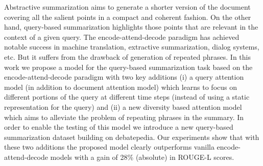 Abstractive summarization aims to generate a shorter version of the document covering all the salient points in a compact and coherent fashion. On the other hand, query-based summarization highlights those points that are relevant in the context of a given query. The encode-attend-decode paradigm has achieved notable success in machine translation, extractive summarization, dialog systems, etc. But it suffers from the drawback of generation of repeated phrases. In this work we propose a model for the query-based summarization task based on the encode-attend-decode paradigm with two key additions (i) a query attention model (in addition to document attention model) which learns to focus on different portions of the query at different time steps (instead of using a static representation for the query) and (ii) a new diversity based attention model which aims to alleviate the problem of repeating phrases in the summary. In order to enable the testing of this model we introduce a new query-based summarization dataset building on debatepedia. Our experiments show that with these two additions the proposed model clearly outperforms vanilla encode-attend-decode models with a gain of 28\% (absolute) in ROUGE-L scores.
